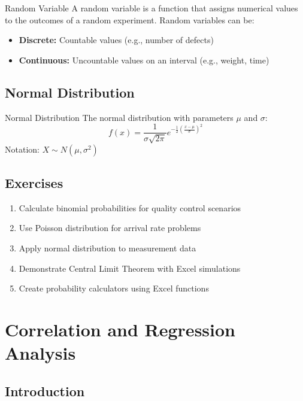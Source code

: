 \documentclass[12pt,a4paper]{book}
\begin{document}
\begin{definition}{Random Variable}
A random variable is a function that assigns numerical values to the outcomes of a random experiment. Random variables can be:
\begin{itemize}
    \item \textbf{Discrete:} Countable values (e.g., number of defects)
    \item \textbf{Continuous:} Uncountable values on an interval (e.g., weight, time)
\end{itemize}
\end{definition}

\section{Normal Distribution}

\begin{definition}{Normal Distribution}
The normal distribution with parameters $\mu$ and $\sigma$:
\[
f(x) = \frac{1}{\sigma\sqrt{2\pi}} e^{-\frac{1}{2}\left(\frac{x-\mu}{\sigma}\right)^2}
\]
Notation: $X \sim N(\mu, \sigma^2)$
\end{definition}

\section{Exercises}

\begin{enumerate}
    \item Calculate binomial probabilities for quality control scenarios
    \item Use Poisson distribution for arrival rate problems
    \item Apply normal distribution to measurement data
    \item Demonstrate Central Limit Theorem with Excel simulations
    \item Create probability calculators using Excel functions
\end{enumerate}

\chapter{Correlation and Regression Analysis}

\section{Introduction}
\end{document}
